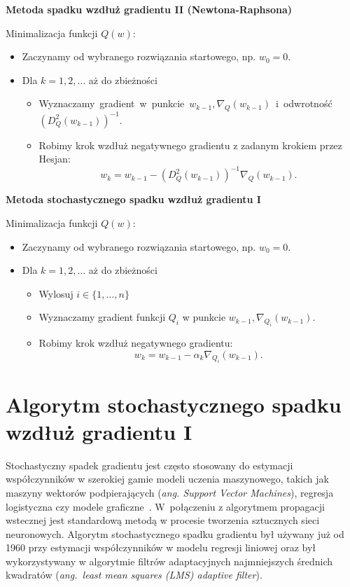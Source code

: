 \begin{center}
\textbf{Metoda spadku wzdłuż gradientu II (Newtona-Raphsona)}
\end{center}
Minimalizacja funkcji $Q(w)$:
\begin{itemize}
\item Zaczynamy od wybranego rozwiązania startowego, np. $w_{0} = 0$.
\item Dla $k = 1, 2, \dots$ aż do zbieżności
	\begin{itemize}
	\item Wyznaczamy~gradient~w~punkcie~$w_{k-1}, \nabla_{Q}(w_{k-1})$~i~odwrotność~$(D_{Q}^{2}(w_{k-1}))^{-1}$.
	\item Robimy krok wzdłuż negatywnego gradientu z zadanym krokiem przez Hesjan: 
	\begin{equation}\label{NJU-rap}
	 w_{k} = w_{k-1} - (D_{Q}^{2}(w_{k-1}))^{-1}\nabla_{Q}(w_{k-1}). 
	 \end{equation}	
	\end{itemize}
\end{itemize}
\begin{center}
\textbf{Metoda stochastycznego spadku wzdłuż gradientu I}
\end{center}
Minimalizacja funkcji $Q(w)$:
\begin{itemize}
\item Zaczynamy od wybranego rozwiązania startowego, np. $w_{0} = 0$.
\item Dla $k = 1, 2, \dots$ aż do zbieżności
	\begin{itemize}
	\item Wylosuj $i \in \{1,\dots,n\}$
	\item Wyznaczamy gradient funkcji $Q_{i}$ w punkcie $w_{k-1}, \nabla_{Q_{i}}(w_{k-1})$.
	\item Robimy krok wzdłuż negatywnego gradientu: 
	\begin{equation}\label{sgdrownanie}
	 w_{k} = w_{k-1} - \alpha_{k}\nabla_{Q_{i}}(w_{k-1}).
	  \end{equation}
	\end{itemize}
\end{itemize}

\section{Algorytm stochastycznego spadku wzdłuż gradientu I}\label{SGD}
\vspace{-5pt}
Stochastyczny spadek gradientu jest często stosowany do estymacji współczynników w szerokiej gamie modeli uczenia maszynowego, takich jak maszyny wektorów podpierających (\textit{ang. Support Vector Machines}), regresja logistyczna czy modele graficzne~\citep{finkel}. W~połączeniu z algorytmem propagacji wstecznej jest standardową metodą w procesie tworzenia sztucznych sieci neuronowych. Algorytm stochastycznego spadku gradientu był używany już od 1960 przy estymacji współczynników w modelu regresji liniowej \citep{ADALINE} oraz był  wykorzystywany w algorytmie filtrów adaptacyjnych najmniejszych średnich kwadratów \citep{widrow2} (\textit{ang.~least mean squares (LMS) adaptive filter}).

